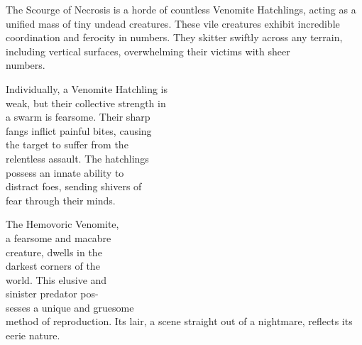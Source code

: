 The Scourge of Necrosis is a horde of countless Venomite Hatchlings, acting as a unified mass of tiny undead creatures. These vile creatures exhibit incredible coordination and ferocity in numbers. They skitter swiftly across any terrain, including vertical surfaces, overwhelming their victims with sheer\\numbers.

Individually, a Venomite Hatchling is\\weak, but their collective strength in\\a swarm is fearsome. Their sharp\\fangs inflict painful bites, causing\\the target to suffer from the\\relentless assault. The hatchlings\\possess an innate ability to\\distract foes, sending shivers of\\fear through their minds.

\vfill\eject %

\vspace*{0.75cm}\hspace*{6.5cm}\vspace*{-2cm}%
%


The Hemovoric Venomite,\\a fearsome and macabre\\creature, dwells in the\\darkest corners of the\\world. This elusive and\\sinister predator pos-\\sesses a unique and gruesome\\method of reproduction. Its lair, a scene straight out of a nightmare, reflects its eerie nature.


